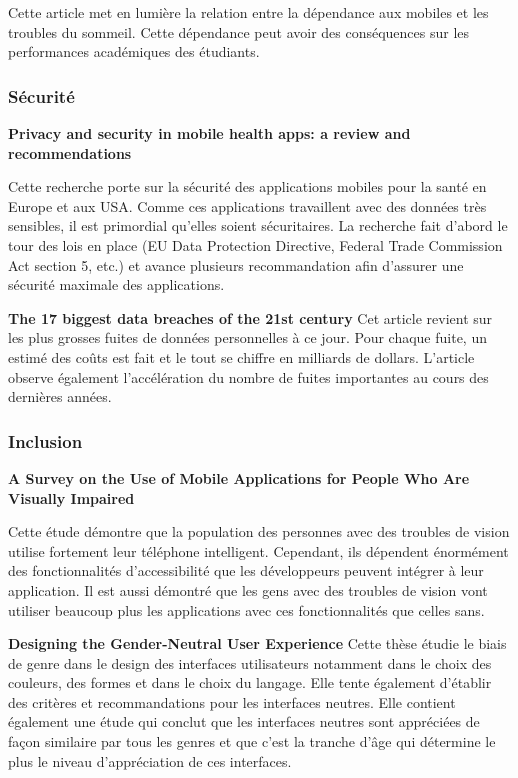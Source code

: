 		Cette article met en lumière la relation entre la dépendance aux mobiles et les troubles du sommeil. Cette dépendance peut avoir des conséquences sur les performances académiques des étudiants.
				
		\subsubsection{Sécurité}
		{\bfseries \cite{privacy} Privacy and security in mobile health apps: a review and recommendations}
		
		Cette recherche porte sur la sécurité des applications mobiles pour la santé en Europe et aux USA. Comme ces applications travaillent avec des données très sensibles, il est primordial qu'elles soient sécuritaires. La recherche fait d'abord le tour des lois en place (EU Data Protection Directive, Federal Trade Commission Act section 5, etc.) et avance plusieurs recommandation afin d'assurer une sécurité maximale des applications.
		
		{\bfseries \cite{dataBreach} The 17 biggest data breaches of the 21st century}
		Cet article revient sur les plus grosses fuites de données personnelles à ce jour. Pour chaque fuite, un estimé des coûts est fait et le tout se chiffre en milliards de dollars. L'article observe également l'accélération du nombre de fuites importantes au cours des dernières années.
		
		
		\subsubsection{Inclusion}
		{\bfseries \cite{visuallyImpaired} A Survey on the Use of Mobile Applications for People Who Are Visually Impaired}
		
		Cette étude démontre que la population des personnes avec des troubles de vision utilise fortement leur téléphone intelligent. Cependant, ils dépendent énormément des fonctionnalités d'accessibilité que les développeurs peuvent intégrer à leur application. Il est aussi démontré que les gens avec des troubles de vision vont utiliser beaucoup plus les applications avec ces fonctionnalités que celles sans.
		
		{\bfseries \cite{genderNeutral} Designing the Gender-Neutral User Experience}
		Cette thèse étudie le biais de genre dans le design des interfaces utilisateurs notamment dans le choix des couleurs, des formes et dans le choix du langage. Elle tente également d'établir des critères et recommandations pour les interfaces neutres. Elle contient également une étude qui conclut que les interfaces neutres sont appréciées de façon similaire par tous les genres et que c'est la tranche d'âge qui détermine le plus le niveau d'appréciation de ces interfaces.
		

